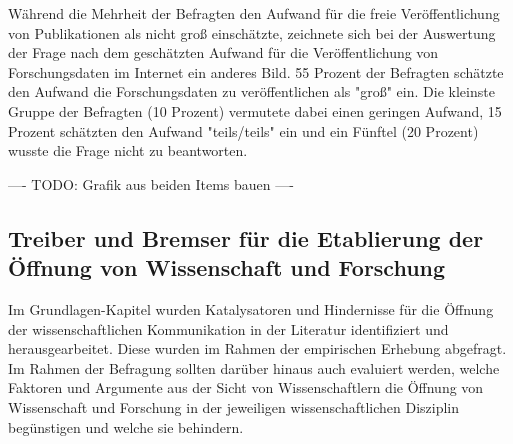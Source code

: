 Während die Mehrheit der Befragten den Aufwand für die freie Veröffentlichung von Publikationen als nicht groß einschätzte, zeichnete sich bei der Auswertung der Frage nach dem geschätzten Aufwand für die Veröffentlichung von Forschungsdaten im Internet ein anderes Bild. 55 Prozent der Befragten schätzte den Aufwand die Forschungsdaten zu veröffentlichen als "groß" ein. Die kleinste Gruppe der Befragten (10 Prozent) vermutete dabei einen geringen Aufwand, 15 Prozent schätzten den Aufwand "teils/teils" ein und ein Fünftel (20 Prozent) wusste die Frage nicht zu beantworten.

---- TODO: Grafik aus beiden Items bauen ----

\subsection{Treiber und Bremser für die Etablierung der Öffnung von Wissenschaft und Forschung}

Im Grundlagen-Kapitel wurden Katalysatoren und Hindernisse für die Öffnung der wissenschaftlichen Kommunikation in der Literatur identifiziert und herausgearbeitet. Diese wurden im Rahmen der empirischen Erhebung abgefragt. Im Rahmen der Befragung sollten darüber hinaus auch evaluiert werden, welche Faktoren und Argumente aus der Sicht von Wissenschaftlern die Öffnung von Wissenschaft und Forschung in der jeweiligen wissenschaftlichen Disziplin begünstigen und welche sie behindern.

